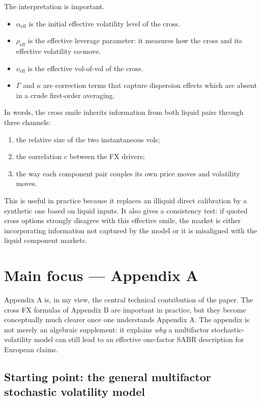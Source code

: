 \documentclass[11pt]{article}
\begin{document}
The interpretation is important.
\begin{itemize}
    \item \(\alpha_{\mathrm{eff}}\) is the initial effective volatility level of the cross.
    \item \(\rho_{\mathrm{eff}}\) is the effective leverage parameter: it measures how the cross and its effective volatility co-move.
    \item \(\nu_{\mathrm{eff}}\) is the effective vol-of-vol of the cross.
    \item \(\Gamma\) and \(\kappa\) are correction terms that capture dispersion effects which are absent in a crude first-order averaging.
\end{itemize}

In words, the cross smile inherits information from both liquid pairs through three channels:
\begin{enumerate}
    \item the relative size of the two instantaneous vols;
    \item the correlation \(c\) between the FX drivers;
    \item the way each component pair couples its own price moves and volatility moves.
\end{enumerate}

This is useful in practice because it replaces an illiquid direct calibration by a synthetic one based on liquid inputs. It also gives a consistency test: if quoted cross options strongly disagree with this effective smile, the market is either incorporating information not captured by the model or it is misaligned with the liquid component markets.

\section{Main focus --- Appendix A}

Appendix A is, in my view, the central technical contribution of the paper. The cross FX formulas of Appendix B are important in practice, but they become conceptually much clearer once one understands Appendix A. The appendix is not merely an algebraic supplement: it explains \emph{why} a multifactor stochastic-volatility model can still lead to an effective one-factor SABR description for European claims.

\subsection{Starting point: the general multifactor stochastic volatility model}
\end{document}
